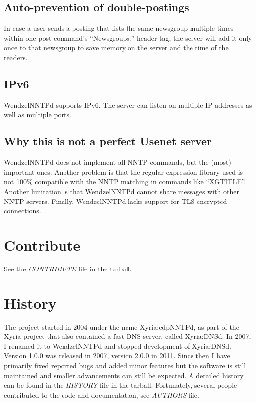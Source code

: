 \subsection{Auto-prevention of double-postings}

In case a user sends a posting that lists the same newsgroup multiple times within one post command's ``Newsgroups:'' header tag, the server will add it only once to that newsgroup to save memory on the server and the time of the readers.

\subsection{IPv6}

WendzelNNTPd supports IPv6. The server can listen on multiple IP addresses as well as multiple ports.

\subsection{Why this is not a perfect Usenet server}

WendzelNNTPd does not implement all NNTP commands, but the (most) important ones. Another problem is that the regular expression library used is not 100\% compatible with the NNTP matching in commands like ``XGTITLE''. Another limitation is that WendzelNNTPd cannot share messages with other NNTP servers. 
%
Finally, WendzelNNTPd lacks support for TLS encrypted connections.

\section{Contribute}

See the \emph{CONTRIBUTE} file in the tarball.

\section{History}

The project started in 2004 under the name Xyria:cdpNNTPd, as part of the Xyria project that also contained a fast DNS server, called Xyria:DNSd. In 2007, I renamed it to WendzelNNTPd and stopped development of Xyria:DNSd. Version 1.0.0 was released in 2007, version 2.0.0 in 2011. Since then I have primarily fixed reported bugs and added minor features but the software is still maintained and smaller advancements can still be expected. A detailed history can be found in the \emph{HISTORY} file in the tarball. Fortunately, several people contributed to the code and documentation, see \emph{AUTHORS} file.

